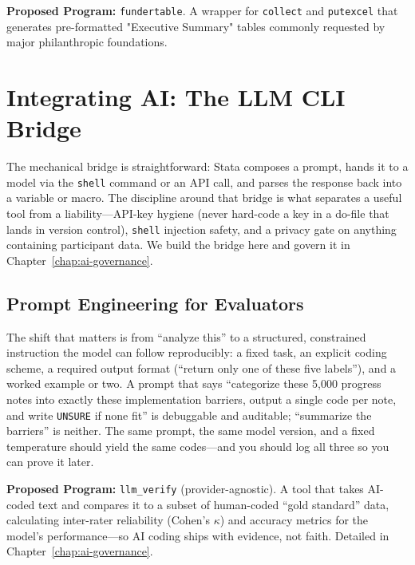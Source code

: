 \documentclass[
    a4paper,
    fontsize=10pt,
    twoside=true,
    numbers=noenddot,
]{kaobook}
\providecommand{\Environment}[1]{\texttt{#1}}
\begin{document}
\begin{kaobox}[frametitle=Ado-file Idea: \texttt{fundertable}]
\textbf{Proposed Program:} \texttt{fundertable}. A wrapper for \Environment{collect} and \Environment{putexcel} that generates pre-formatted "Executive Summary" tables commonly requested by major philanthropic foundations.
\end{kaobox}

\section{Integrating AI: The LLM CLI Bridge}
The mechanical bridge is straightforward: Stata composes a prompt, hands it to a model via the \texttt{shell} command or an API call, and parses the response back into a variable or macro. The discipline around that bridge is what separates a useful tool from a liability---API-key hygiene (never hard-code a key in a do-file that lands in version control), \texttt{shell} injection safety, and a privacy gate on anything containing participant data. We build the bridge here and govern it in Chapter~\ref{chap:ai-governance}.

\subsection{Prompt Engineering for Evaluators}
The shift that matters is from \enquote{analyze this} to a structured, constrained instruction the model can follow reproducibly: a fixed task, an explicit coding scheme, a required output format (\enquote{return only one of these five labels}), and a worked example or two. A prompt that says \enquote{categorize these 5{,}000 progress notes into exactly these implementation barriers, output a single code per note, and write \texttt{UNSURE} if none fit} is debuggable and auditable; \enquote{summarize the barriers} is neither. The same prompt, the same model version, and a fixed temperature should yield the same codes---and you should log all three so you can prove it later.

\begin{kaobox}[frametitle=Ado-file Idea: \texttt{llm\_verify}]
\textbf{Proposed Program:} \texttt{llm\_verify} (provider-agnostic). A tool that takes AI-coded text and compares it to a subset of human-coded \enquote{gold standard} data, calculating inter-rater reliability (Cohen's $\kappa$) and accuracy metrics for the model's performance---so AI coding ships with evidence, not faith. Detailed in Chapter~\ref{chap:ai-governance}.
\end{kaobox}
\end{document}
